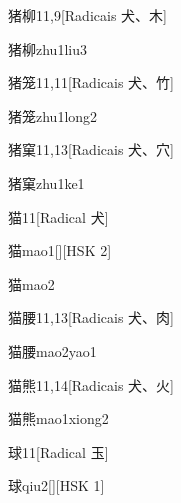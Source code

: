 \begin{entry}{猪柳}{11,9}[Radicais ⽝、⽊]
  \begin{phonetics}{猪柳}{zhu1liu3}
  \end{phonetics}
\end{entry}

\begin{entry}{猪笼}{11,11}[Radicais ⽝、⽵]
  \begin{phonetics}{猪笼}{zhu1long2}
  \end{phonetics}
\end{entry}

\begin{entry}{猪窠}{11,13}[Radicais ⽝、⽳]
  \begin{phonetics}{猪窠}{zhu1ke1}
  \end{phonetics}
\end{entry}

\begin{entry}{猫}{11}[Radical ⽝]
  \begin{phonetics}{猫}{mao1}[][HSK 2]
  \end{phonetics}
  \begin{phonetics}{猫}{mao2}
  \end{phonetics}
\end{entry}

\begin{entry}{猫腰}{11,13}[Radicais ⽝、⾁]
  \begin{phonetics}{猫腰}{mao2yao1}
  \end{phonetics}
\end{entry}

\begin{entry}{猫熊}{11,14}[Radicais ⽝、⽕]
  \begin{phonetics}{猫熊}{mao1xiong2}
  \end{phonetics}
\end{entry}

\begin{entry}{球}{11}[Radical ⽟]
  \begin{phonetics}{球}{qiu2}[][HSK 1]
  \end{phonetics}
\end{entry}

